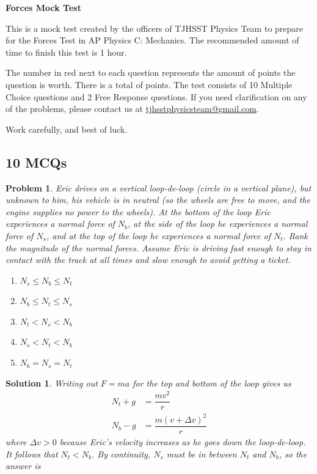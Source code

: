 \documentclass[12pt]{article}
\newcommand{\clearpts}{\addtocounter{tpts}{\value{cpts}} \setcounter{cpts}{0}}
\newcommand{\pts}[1]{\clearpts \setcounter{cpts}{#1}}
\newcommand{\totpts}{\setcounter{endpts}{\totvalue{tpts} + \totvalue{cpts}}\arabic{endpts}}
\newcommand{\ptfmt}[1]{\textbf{\color{ptred}#1\color{black}}}
\newtheorem*{solution}{Solution}
\theoremstyle{mystyle}
\newtheorem{pproblem}{Problem}
\newcommand{\psettitle}[1]{
    \begin{center}
    \huge \textbf{#1}
    \end{center}
}
\begin{document}
\psettitle{Forces Mock Test}

\noindent
This is a mock test created by the officers of TJHSST Physics Team to prepare for the Forces Test in AP Physics C: Mechanics.
The recommended amount of time to finish this test is 1 hour.

The number in red next to each question represents the amount of points the question is worth. There is a total of \ptfmt{\totpts} points. The test consists of 10 Multiple Choice questions and 2 Free Response questions. If you need clarification on any of the problems, please contact us at \href{mailto:tjhsstphysicsteam@sgmail.com}{tjhsstphysicsteam@gmail.com}.

Work carefully, and best of luck.

\newpage

\subsection*{10 MCQs}

\pts{2}
\begin{pproblem}
    Eric drives on a vertical loop-de-loop (circle in a vertical plane), but unknown to him, his vehicle is in neutral (so the wheels are free to move, and the engine supplies no power to the wheels). At the bottom of the loop Eric experiences a normal force of $N_b$, at the
    side of the loop he experiences a normal force of $N_s$, and at the top
    of the loop he experiences a normal force of $N_t$. Rank the magnitude of
    the normal forces.
    Assume Eric is driving fast enough to stay in contact with the track at all times and slow
    enough to avoid getting a ticket.

    \begin{enumerate}[label=(\Alph*)]
        \item $N_s\le N_b\le N_t$
        \item $N_b\le N_t\le N_s$
        \item $N_t < N_s < N_b$
        \item $N_s < N_t < N_b$
        \item $N_b = N_s = N_t$
    \end{enumerate}
\end{pproblem}
\begin{solution}
    Writing out $F=ma$ for the top and bottom of the loop gives us
    \begin{align*}
        N_t+g&=\dfrac{mv^2}{r}\\
        N_b-g&=\dfrac{m(v+\Delta v)^2}{r}
    \end{align*}
    where $\Delta v>0$ because Eric's velocity increases as he goes down the loop-de-loop.
    It follows that $N_t<N_b$.
    By continuity, $N_s$ must be in between $N_t$ and $N_b$, so the answer is
\end{solution}
\end{document}
